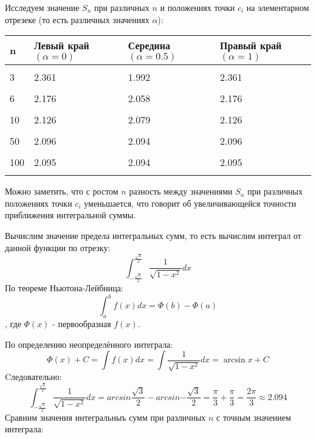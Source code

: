 \documentclass[12pt, a4paper]{article}
\begin{document}
Исследуем значение $S_n$ при различных $n$ и положениях точки $c_i$ на элементарном отрезеке (то есть различных значениях $\alpha$):
\begin{center}
\begin{tabular}{l l l l}
\textbf{n} & \textbf{Левый край $\left(\alpha=0\right)$} & \textbf{Середина $\left(\alpha=0.5\right)$} & \textbf{Правый край$\left(\alpha=1\right)$}\\
\hline\\
3 & 2.361 & 1.992 & 2.361\\
\hline\\
6 & 2.176 & 2.058 & 2.176\\
\hline\\
10 & 2.126 & 2.079 & 2.126\\
\hline\\
50 & 2.096 & 2.094 & 2.096\\
\hline\\
100 & 2.095 & 2.094 & 2.095\\
\hline\\
\end{tabular}

\end{center}
Можно заметить, что с ростом $n$ разность между значениями $S_n$ при различных положениях точки $c_i$ уменьшается, что говорит об увеличивающейся точности приближения интегральной суммы.

Вычислим значение предела интегральных сумм, то есть вычислим интеграл от данной функции по отрезку:
\begin{equation*}
\int_{-\frac{\sqrt{3}}{2}}^{\frac{\sqrt{3}}{2}} \frac{1}{\sqrt{1-x^2}} dx
\end{equation*}
По теореме Ньютона-Лейбница:
\begin{equation*}
\int_{a}^{b} f(x) dx = \Phi(b) - \Phi(a)
\end{equation*},
где $\Phi(x)$ - первообразная $f(x)$.

По определению неопределённого интеграла:
\begin{equation*}
\Phi(x) + C = \int f(x)dx = \int \frac{1}{\sqrt{1-x^2}}dx = \arcsin{x} + C
\end{equation*}
Cледовательно:
\begin{equation*}
\int_{-\frac{\sqrt{3}}{2}}^{\frac{\sqrt{3}}{2}} \frac{1}{\sqrt{1-x^2}} dx = arcsin{\frac{\sqrt{3}}{2}} - arcsin{-\frac{\sqrt{3}}{2}} = \frac{\pi}{3} + \frac{\pi}{3} = \frac{2\pi}{3} \approx 2.094
\end{equation*}
Сравним значения интегральныъ сумм при различных $n$ с точным значением интеграла:
\end{document}
